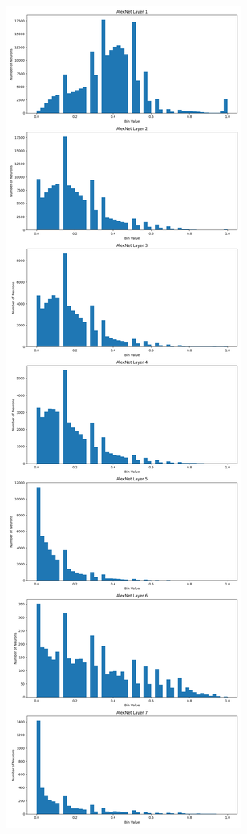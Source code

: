 \documentclass{article}
\begin{document}
        \begin{figure}[H]
            \centering
            \begin{minipage}{0.45\textwidth}
                \centering
                \includegraphics[width=\textwidth]{images/alexnet_class_frequency_list_n01601694.png} %
                

\end{minipage}
\end{figure}
\end{document}
